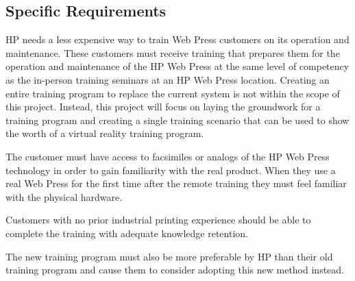 \documentclass[onecolumn, draftclsnofoot,10pt, compsoc]{IEEEtran}
\begin{document}
\subsection{Specific Requirements}
HP needs a less expensive way to train Web Press customers on its operation and maintenance. These customers must receive training that prepares them for the operation and maintenance of the HP Web Press at the same level of competency as the in-person training seminars at an HP Web Press location. Creating an entire training program to replace the current system is not within the scope of this project. Instead, this project will focus on laying the groundwork for a training program and creating a single training scenario that can be used to show the worth of a virtual reality training program. 

The customer must have access to facsimiles or analogs of the HP Web Press technology in order to gain familiarity with the real product. When they use a real Web Press for the first time after the remote training they must feel familiar with the physical hardware.

Customers with no prior industrial printing experience should be able to complete the training with adequate knowledge retention.


The new training program must also be more preferable by HP than their old training program and cause them to consider adopting this new method instead.

\end{document}

